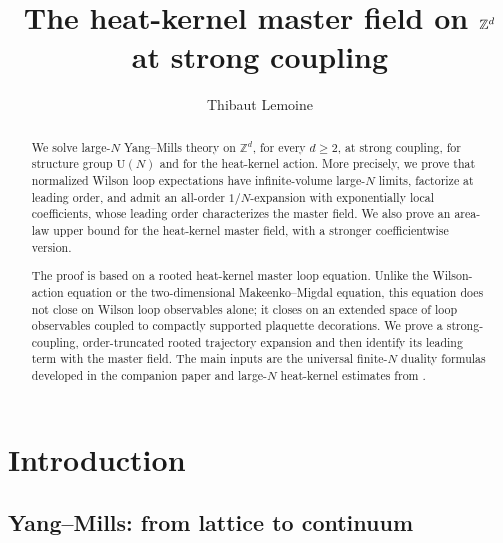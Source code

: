 \documentclass[11pt,a4paper,reqno]{amsart}
\title{The heat-kernel master field on $\Z^d$ at strong coupling}
\author{Thibaut Lemoine}
\theoremstyle{definition}
\theoremstyle{remark}
\newcommand\Z{{\mathbb{Z}}}
\begin{document}
\maketitle

\begin{abstract}
We solve large-$N$ Yang--Mills theory on $\Z^d$, for every $d\geq2$, at strong coupling, for structure group $\mathrm U(N)$ and for the heat-kernel action. More precisely, we prove that normalized Wilson loop expectations have infinite-volume large-$N$ limits, factorize at leading order, and admit an all-order $1/N$-expansion with exponentially local coefficients, whose leading order characterizes the master field. We also prove an area-law upper bound for the heat-kernel master field, with a stronger coefficientwise version.

The proof is based on a rooted heat-kernel master loop equation. Unlike the Wilson-action equation or the two-dimensional Makeenko--Migdal equation, this equation does not close on Wilson loop observables alone; it closes on an extended space of loop observables coupled to compactly supported plaquette decorations. We prove a strong-coupling, order-truncated rooted trajectory expansion and then identify its leading term with the master field. The main inputs are the universal finite-$N$ duality formulas developed in the companion paper \cite{Lem26a} and large-$N$ heat-kernel estimates from \cite{LemMai25,LM2}.

\end{abstract}

\tableofcontents

\section{Introduction}

\subsection{Yang--Mills: from lattice to continuum}
\end{document}
